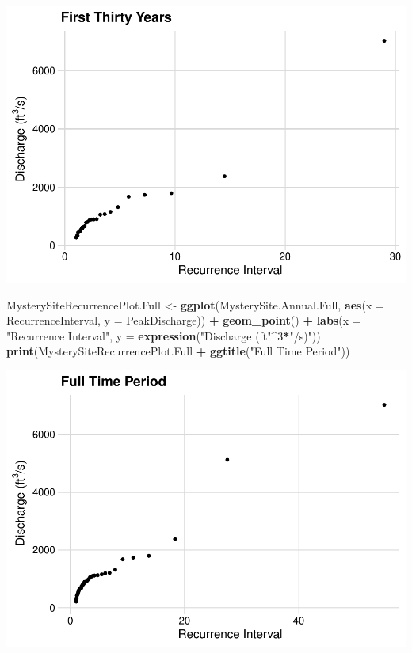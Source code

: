 \documentclass[]{article}
\newenvironment{Shaded}{\begin{snugshade}}{\end{snugshade}}
\newcommand{\DataTypeTok}[1]{\textcolor[rgb]{0.13,0.29,0.53}{#1}}
\newcommand{\DecValTok}[1]{\textcolor[rgb]{0.00,0.00,0.81}{#1}}
\newcommand{\KeywordTok}[1]{\textcolor[rgb]{0.13,0.29,0.53}{\textbf{#1}}}
\newcommand{\NormalTok}[1]{#1}
\newcommand{\OperatorTok}[1]{\textcolor[rgb]{0.81,0.36,0.00}{\textbf{#1}}}
\newcommand{\StringTok}[1]{\textcolor[rgb]{0.31,0.60,0.02}{#1}}
\begin{document}
\includegraphics{Cai_A03_RiversPhysical_files/figure-latex/unnamed-chunk-3-1.pdf}

\begin{Shaded}
\begin{Highlighting}[]
\NormalTok{MysterySiteRecurrencePlot.Full <-}
\StringTok{  }\KeywordTok{ggplot}\NormalTok{(MysterySite.Annual.Full, }\KeywordTok{aes}\NormalTok{(}\DataTypeTok{x =}\NormalTok{ RecurrenceInterval, }\DataTypeTok{y =}\NormalTok{ PeakDischarge)) }\OperatorTok{+}
\StringTok{  }\KeywordTok{geom_point}\NormalTok{() }\OperatorTok{+}
\StringTok{  }\KeywordTok{labs}\NormalTok{(}\DataTypeTok{x =} \StringTok{"Recurrence Interval"}\NormalTok{, }\DataTypeTok{y =} \KeywordTok{expression}\NormalTok{(}\StringTok{"Discharge (ft"}\OperatorTok{^}\DecValTok{3}\OperatorTok{*}\StringTok{"/s)"}\NormalTok{))}
\KeywordTok{print}\NormalTok{(MysterySiteRecurrencePlot.Full }\OperatorTok{+}\StringTok{ }\KeywordTok{ggtitle}\NormalTok{(}\StringTok{"Full Time Period"}\NormalTok{))}
\end{Highlighting}
\end{Shaded}

\includegraphics{Cai_A03_RiversPhysical_files/figure-latex/unnamed-chunk-3-2.pdf}
\end{document}
